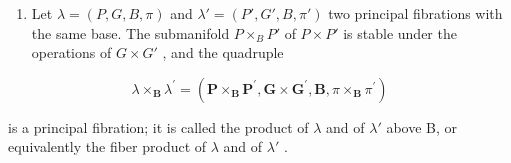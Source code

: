 \begin{enumerate}
\def\labelenumi{(\alph{enumi})}
\setcounter{enumi}{2}
\tightlist
\item
  Let \(\lambda = (P, G, B, \pi)\) and \(\lambda' = (P', G', B, \pi')\) two principal fibrations with the same base. The submanifold \(P \times_{B} P'\) of \(P \times P'\) is stable under the operations of \(G \times G'\) , and the quadruple
\end{enumerate}

\[
\lambda \times_ {\mathbf {B}} \lambda^ {\prime} = (\mathbf {P} \times_ {\mathbf {B}} \mathbf {P} ^ {\prime}, \mathbf {G} \times \mathbf {G} ^ {\prime}, \mathbf {B}, \pi \times_ {\mathbf {B}} \pi^ {\prime})
\]

is a principal fibration; it is called the product of \(\lambda\) and of \(\lambda'\) above B, or equivalently the fiber product of \(\lambda\) and of \(\lambda'\) .

